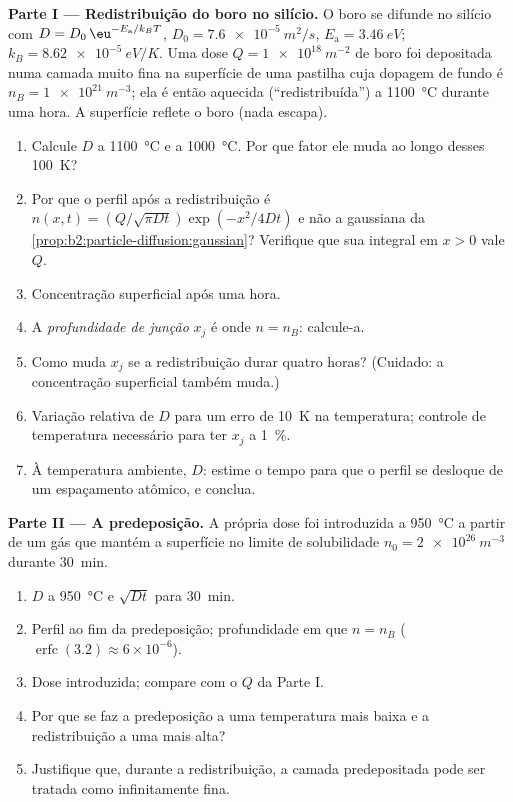 \begin{problem}\label{pb:b2:particle-diffusion:1}
\textbf{Parte I --- Redistribuição do boro no silício.}
O boro se difunde no silício com $D = D_0\,\eu^{-E_{\text{a}}/k_BT}$, $D_0 =
\qty{7.6e-5}{m^2/s}$, $E_{\text{a}} = \qty{3.46}{eV}$; $k_B =
\qty{8.62e-5}{eV/K}$. Uma dose $Q = \qty{1e18}{m^{-2}}$ de boro foi
depositada numa camada muito fina na superfície de uma pastilha cuja
dopagem de fundo é $n_B = \qty{1e21}{m^{-3}}$; ela é então aquecida
(``redistribuída'') a \qty{1100}{\celsius} durante uma hora. A superfície
reflete o boro (nada escapa).
\begin{enumerate}
  \item Calcule $D$ a \qty{1100}{\celsius} e a \qty{1000}{\celsius}.
        Por que fator ele muda ao longo desses \qty{100}{K}?
  \item Por que o perfil após a redistribuição é $n(x,t) = (Q/\sqrt{\pi
        Dt})\exp(-x^2/4Dt)$ e não a gaussiana da
        \cref{prop:b2:particle-diffusion:gaussian}? Verifique que sua
        integral em $x > 0$ vale $Q$.
  \item Concentração superficial após uma hora.
  \item A \emph{profundidade de junção} $x_j$ é onde $n = n_B$: calcule-a.
  \item Como muda $x_j$ se a redistribuição durar quatro horas?
        (Cuidado: a concentração superficial também muda.)
  \item Variação relativa de $D$ para um erro de \qty{10}{K} na temperatura;
        controle de temperatura necessário para ter $x_j$ a \qty{1}{\%}.
  \item À temperatura ambiente, $D$: estime o tempo para que o perfil se
        desloque de um espaçamento atômico, e conclua.
\end{enumerate}

\textbf{Parte II --- A predeposição.}
A própria dose foi introduzida a \qty{950}{\celsius} a partir de um gás que mantém
a superfície no limite de solubilidade $n_0 = \qty{2e26}{m^{-3}}$ durante
\qty{30}{min}.
\begin{enumerate}[resume]
  \item $D$ a \qty{950}{\celsius} e $\sqrt{Dt}$ para \qty{30}{min}.
  \item Perfil ao fim da predeposição; profundidade em que $n =
        n_B$ ($\operatorname{erfc}(3.2) \approx 6 \times 10^{-6}$).
  \item Dose introduzida; compare com o $Q$ da Parte I.
  \item Por que se faz a predeposição a uma temperatura mais baixa e a redistribuição a
        uma mais alta?
  \item Justifique que, durante a redistribuição, a camada predepositada pode ser
        tratada como infinitamente fina.
\end{enumerate}


\end{problem}
